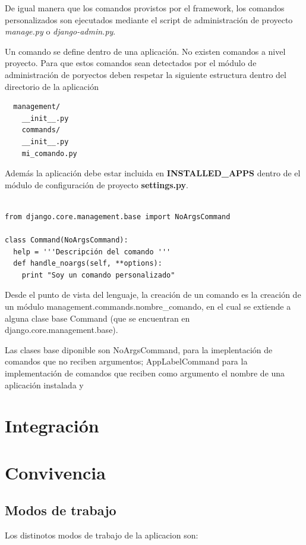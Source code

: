 \documentclass[a4paper]{report}
\begin{document}
De igual manera que los comandos provistos por el framework, los comandos
personalizados son ejecutados mediante el script de administración
de proyecto \emph{manage.py} o \emph{django-admin.py}.

Un comando se define dentro de una aplicación. No existen comandos a nivel
proyecto. Para que estos comandos sean detectados por el módulo de
administración de poryectos deben  respetar la siguiente estructura dentro del
directorio de la aplicación 
\begin{verbatim}
  management/
    __init__.py
    commands/
	__init__.py
	mi_comando.py
\end{verbatim}

Además la aplicación debe estar incluida en \textbf{INSTALLED\_APPS}
dentro de el módulo de configuración de proyecto \textbf{settings.py}.

\begin{lstlisting}[style=python,
		   label=basic-django-command,
		   caption=Comando personalizado básico en Django]

from django.core.management.base import NoArgsCommand

class Command(NoArgsCommand):
  help = '''Descripción del comando '''
  def handle_noargs(self, **options):
    print "Soy un comando personalizado"

\end{lstlisting}

Desde el punto de vista del lenguaje, la creación de un comando es la creación
de un módulo management.commands.nombre\_comando, en el cual se extiende 
a alguna clase base Command (que se encuentran en django.core.management.base).

Las clases base diponible son NoArgsCommand, para la imeplentación de comandos
que no reciben argumentos; AppLabelCommand para la implementación de comandos
que reciben como argumento el nombre de una aplicación instalada y 

\section{Integración}
\section{Convivencia}

\subsection{Modos de trabajo}
Los distinotos modos de trabajo de la aplicacion son:
\end{document}
